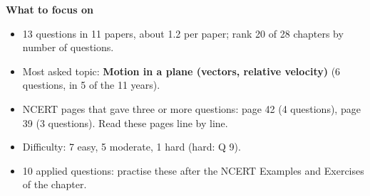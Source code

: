 \begin{minipage}[t]{0.63\linewidth}{\small\textbf{\color{crimson}What to focus on}\par\smallskip
\begin{itemize}[leftmargin=1.1em,itemsep=1pt,topsep=0pt]
\item 13 questions in 11 papers, about 1.2 per paper; rank 20 of 28 chapters by number of questions.
\item Most asked topic: \textbf{Motion in a plane (vectors, relative velocity)} (6 questions, in 5 of the 11 years).
\item NCERT pages that gave three or more questions: page 42 (4 questions), page 39 (3 questions). Read these pages line by line.
\item Difficulty: 7 easy, 5 moderate, 1 hard (hard: Q 9).
\item 10 applied questions: practise these after the NCERT Examples and Exercises of the chapter.
\end{itemize}}\end{minipage}\par
{}
